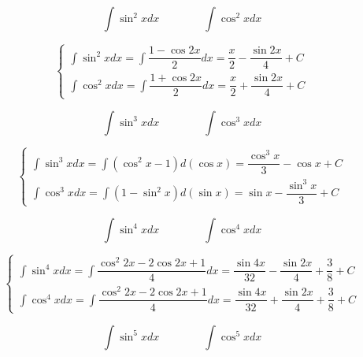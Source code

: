 \begin{corollary}[扩展不定积分]
	\begin{proposition}
		$$\int \sin^{2}x dx\qquad\qquad \int \cos^{2} xdx $$
	\end{proposition}
	\begin{solution}

		$$\begin{cases} 
			\int \sin^{2} x dx = \int \dfrac{1-\cos 2x}{2} dx = \dfrac{x}{2} -\dfrac{\sin 2x}{4} +C\\
			\int \cos^{2} x dx = \int \dfrac{1+\cos 2x}{2} dx = \dfrac{x}{2} +\dfrac{\sin 2x}{4} +C 
		\end{cases}$$
	\end{solution}


	\begin{proposition}
		$$\int \sin^{3}x dx\qquad\qquad \int \cos^{3} xdx $$
	\end{proposition}
	\begin{solution}

		$$\begin{cases}
			\int \sin^{3} x dx = \int (\cos^{2}x -1) d(\cos x) = \dfrac{\cos^{3}x}{3} -\cos x +C\\ 
			\int \cos^{3} x dx = \int (1-\sin^{2} x) d(\sin x) = \sin x - \dfrac{\sin^{3} x}{3} +C 
		\end{cases}$$
	\end{solution}



	\begin{proposition}
		$$\int \sin^{4}x dx\qquad\qquad \int \cos^{4} xdx $$
	\end{proposition}
	\begin{solution}

		$$\begin{cases} 
			\int \sin^{4} x dx = \int \dfrac{\cos^{2}2x-2\cos 2x+1}{4} dx = \dfrac{\sin 4x}{32} -\dfrac{\sin 2x}{4} + \dfrac{3}{8} + C\\ 
			\int \cos^{4} x dx = \int \dfrac{\cos^{2}2x-2\cos 2x+1}{4} dx = \dfrac{\sin 4x}{32} + \dfrac{\sin 2x}{4} + \dfrac{3}{8} + C 
		\end{cases}$$
	\end{solution}



	\begin{proposition}
		$$\int \sin^{5}x dx\qquad\qquad \int \cos^{5} xdx $$
	\end{proposition}
	\begin{solution}


\end{solution}
\end{corollary}
